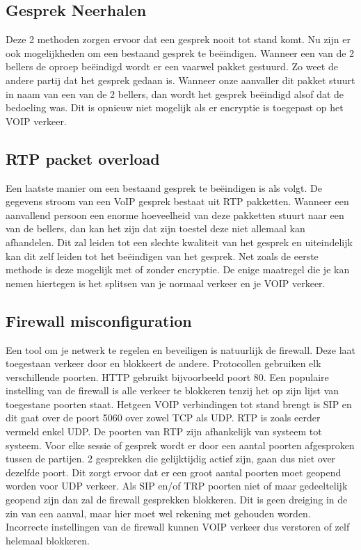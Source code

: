 \documentclass[pdftex,a4paper,12pt,twoside]{report}
\begin{document}
\subsection{Gesprek Neerhalen}
Deze 2 methoden zorgen ervoor dat een gesprek nooit tot stand komt. Nu zijn er ook mogelijkheden om een bestaand gesprek te beëindigen. Wanneer een van de 2 bellers de oproep beëindigd wordt er een vaarwel pakket gestuurd. Zo weet de andere partij dat het gesprek gedaan is. Wanneer onze aanvaller dit pakket stuurt in naam van een van de 2 bellers, dan wordt het gesprek beëindigd alsof dat de bedoeling was. Dit is opnieuw niet mogelijk als er encryptie is toegepast op het VOIP verkeer.

\subsection{RTP packet overload}
Een laatste manier om een bestaand gesprek te beëindigen is als volgt. De gegevens stroom van een VoIP gesprek bestaat uit RTP pakketten. Wanneer een aanvallend persoon een enorme hoeveelheid van deze pakketten stuurt naar een van de bellers, dan kan het zijn dat zijn toestel deze niet allemaal kan afhandelen. Dit zal leiden tot een slechte kwaliteit van het gesprek en uiteindelijk kan dit zelf leiden tot het beëindigen van het gesprek. Net zoals de eerste methode is deze mogelijk met of zonder encryptie. De enige maatregel die je kan nemen hiertegen is het splitsen van je normaal verkeer en je VOIP verkeer.

\subsection{Firewall misconfiguration}
Een tool om je netwerk te regelen en beveiligen is natuurlijk de firewall. Deze laat toegestaan verkeer door en blokkeert de andere. Protocollen gebruiken elk verschillende poorten. HTTP gebruikt bijvoorbeeld poort 80. Een populaire instelling van de firewall is alle verkeer te blokkeren tenzij het op zijn lijst van toegestane poorten staat. Hetgeen VOIP verbindingen tot stand brengt is SIP en dit gaat over de poort 5060 over zowel TCP als UDP. RTP is zoals eerder vermeld enkel UDP. De poorten van RTP zijn afhankelijk van systeem tot systeem. Voor elke sessie of gesprek wordt er door een aantal poorten afgesproken tussen de partijen. 2 gesprekken die gelijktijdig actief zijn, gaan dus niet over dezelfde poort. Dit zorgt ervoor dat er een groot aantal poorten moet geopend worden voor UDP verkeer. Als SIP en/of TRP poorten niet of maar gedeeltelijk geopend zijn dan zal de firewall gesprekken blokkeren. Dit is geen dreiging in de zin van een aanval, maar hier moet wel rekening met gehouden worden. Incorrecte instellingen van de firewall kunnen VOIP verkeer dus verstoren of zelf helemaal blokkeren.
\end{document}
